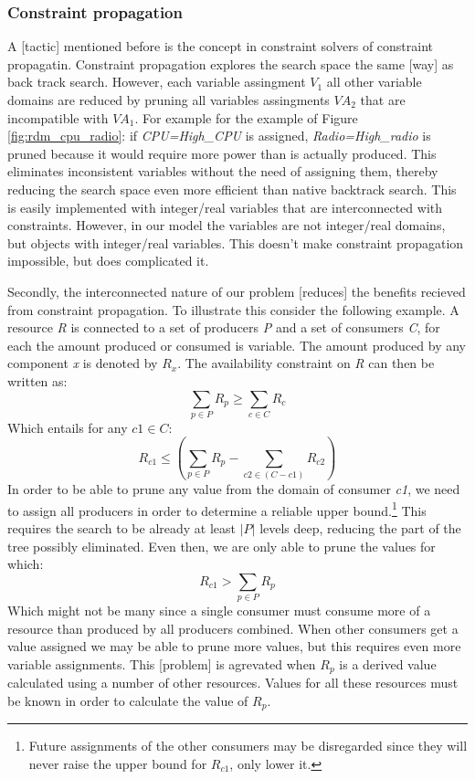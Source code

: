 \subsubsection{Constraint propagation}
A [tactic] mentioned before is the concept in constraint solvers of constraint propagatin. Constraint propagation explores the search space the same [way] as back track search. However, each variable assingment $V_1$ all other variable domains are reduced by pruning all variables assingments $VA_2$ that are incompatible with $VA_1$. For example for the example of Figure \ref{fig:rdm_cpu_radio}: if \emph{CPU=High\_CPU} is assigned, \emph{Radio=High\_radio} is pruned because it would require more power than is actually produced. This eliminates inconsistent variables without the need of assigning them, thereby reducing the search space even more efficient than native backtrack search. This is easily implemented with integer/real variables that are interconnected with constraints. However, in our model the variables are not integer/real domains, but objects with integer/real variables. This doesn't make constraint propagation impossible, but does complicated it.

Secondly, the interconnected nature of our problem [reduces] the benefits recieved from constraint propagation. To illustrate this consider the following example. A resource \emph{R} is connected to a set of producers \emph{P} and a set of consumers \emph{C}, for each the amount produced or consumed is variable. The amount produced by any component \emph{x} is denoted by $R_x$. The availability constraint on \emph{R} can then be written as:
$$\sum_{p \in P}R_p \geq \sum_{c \in C}R_c$$
Which entails for any $c1 \in C$: 
$$R_{c1} \leq (\sum_{p \in P} R_p - \sum_{c2 \in (C-c1)} R_{c2})$$
In order to be able to prune any value from the domain of consumer \emph{c1}, we need to assign all producers in order to determine a reliable upper bound.\footnote{Future assignments of the other consumers may be disregarded since they will never raise the upper bound for $R_{c1}$, only lower it.} This requires the search to be already at least $|P|$ levels deep, reducing the part of the tree possibly eliminated. Even then, we are only able to prune the values for which:
$$R_{c1} > \sum_{p \in P} R_p$$
Which might not be many since a single consumer must consume more of a resource than produced by all producers combined. When other consumers get a value assigned we may be able to prune more values, but this requires even more variable assignments. This [problem] is agrevated when $R_p$ is a derived value calculated using a number of other resources. Values for all these resources must be known in order to calculate the value of $R_p$.

